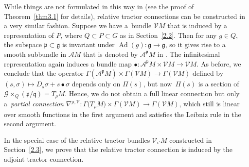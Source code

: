 \documentclass[pdftex]{sigma}
\numberwithin{equation}{section}
\def\frak{\mathfrak}
\def\Cal{\mathcal}
\newcommand{\x}{\times}
\newcommand{\si}{\sigma}
\newcommand{\Ga}{\Gamma}
\newcommand{\Ad}{\operatorname{Ad}}
\begin{document}
While things are not formulated in this way in \cite{Rel-BGG2} (see the proof of
Theorem~\ref{thm3.1} for details), relative tractor connections can be constructed in
a very similar fashion. Suppose we have a~bundle $\Cal VM$ that is induced by a
representation of $P$, where $Q\subset P\subset G$ as in Section~\ref{2.2}. Then for any
$g\in Q$, the subspace $\frak p\subset\frak g$ is invariant under $\Ad(g)\colon \frak
g\to\frak g$, so it gives rise to a smooth subbundle in $\Cal AM$ that is denoted by
$\Cal A^{\frak p}M$ in \cite{Rel-BGG2}. The infinitesimal representation again
induces a bundle map $\bullet\colon \Cal A^{\frak p}M\x\Cal VM\to\Cal VM$. As before, we
conclude that the operator $\Ga(\Cal A^{\frak p}M)\x\Ga(\Cal VM)\to \Ga(\Cal VM)$
defined by $(s,\si)\mapsto D_s\si+s\bullet\si$ depends only on $\Pi(s)$, but now~$\Pi(s)$ is a section of $\Cal G\x_Q(\frak p/\frak q)=T_\rho M$. Hence, we do not obtain
a full linear connection but only a~\textit{partial connection} $\nabla^{\rho,\Cal V}\colon
\Ga\bigl(T_\rho M\bigr)\x\Ga(\Cal VM)\to\Ga(\Cal VM)$,
which still is linear over smooth
functions in the first argument and satisfies the Leibniz rule in the second
argument.

In the special case of the relative tractor bundles $\Cal V_{i'}M$ constructed in Section~\ref{2.3}, we prove that the relative tractor connection is induced by the adjoint
tractor connection.
\end{document}
